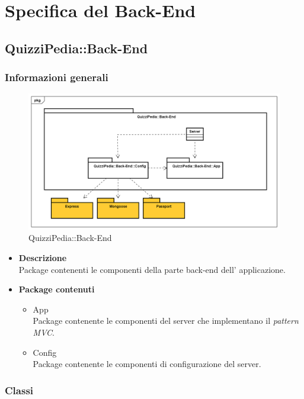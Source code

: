 \newpage
\section{Specifica del Back-End}
\subsection{QuizziPedia::Back-End}
\subsubsection{Informazioni generali}
\label{QuizziPedia::Back-End}
\begin{figure}
	\centering
	\includegraphics[scale=0.45]{UML/Package/QuizziPedia_Back-End.png}
	\caption{QuizziPedia::Back-End}
\end{figure}

	\begin{itemize}
		\item \textbf{Descrizione} \\ Package contenenti le componenti della parte back-end dell' applicazione.
		\item \textbf{Package contenuti}
		\begin{itemize}
			\item App \\
			Package contenente le componenti del server che implementano il \textit{pattern MVC}.
			\item Config \\
			Package contenente le componenti di configurazione del server.
		\end{itemize}
	\end{itemize}
\subsubsection{Classi}
